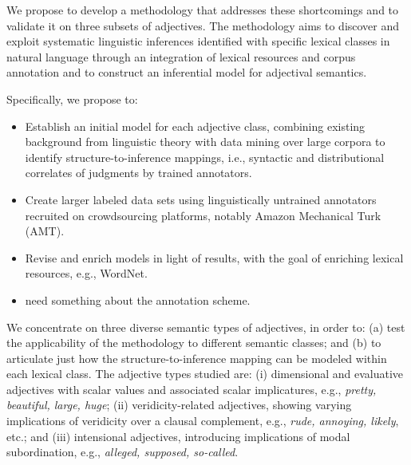 \documentclass[10pt]{article}
\newcommand{\moveup}{\vspace*{-1.8mm}}
\begin{document}
We propose to develop a methodology that addresses these shortcomings and to validate it on three subsets of adjectives. The methodology aims to discover and exploit systematic linguistic inferences identified with specific lexical classes in natural language through an integration of lexical resources and corpus annotation and to construct an inferential model for adjectival semantics. 

Specifically, we propose to:
\begin{itemize}
\moveup
\item Establish an initial model for each adjective class, combining existing background from linguistic theory with data mining over large corpora to identify structure-to-inference mappings, i.e., syntactic and distributional correlates of judgments by trained annotators.
\moveup
\item Create larger labeled data sets using linguistically untrained annotators recruited on crowdsourcing platforms, notably Amazon Mechanical Turk (AMT).
\moveup
\item Revise and enrich models in light of results, with the goal of enriching lexical resources, e.g.,  WordNet. 
\item need something about the annotation scheme.  
\end{itemize}
\moveup
 
We concentrate on three diverse semantic types of adjectives, in order to: (a) test the applicability of the methodology to different semantic classes; and (b) to articulate just how the structure-to-inference mapping can be modeled within each lexical class. The adjective types studied are: (i) dimensional and evaluative adjectives with scalar values and associated scalar implicatures, e.g., \textit{pretty, beautiful, large, huge}; (ii) veridicity-related adjectives, showing varying implications of veridicity over a clausal complement, e.g., \textit{rude, annoying, likely}, etc.; and (iii) intensional adjectives, introducing implications of modal subordination, e.g., \textit{alleged, supposed, so-called}. 
\end{document}
